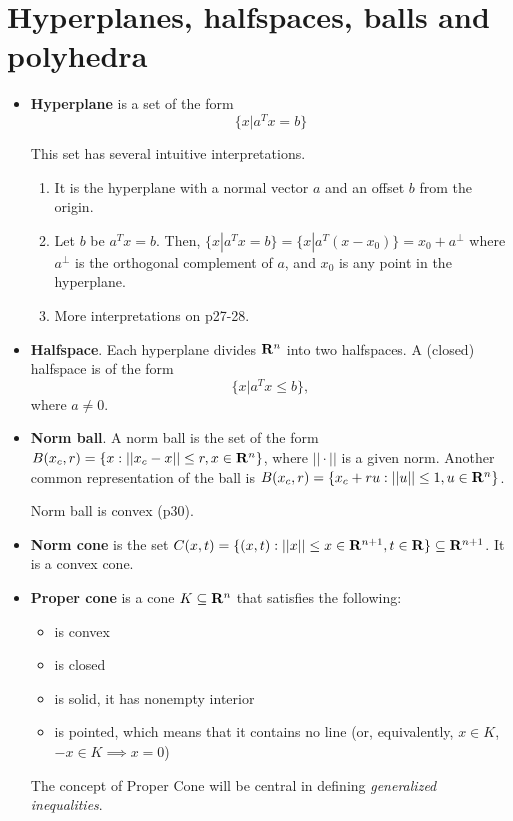 \documentclass[a4paper, oneside]{book}
\begin{document}
\section{Hyperplanes, halfspaces, balls and polyhedra}
\begin{itemize}
\item \textbf{Hyperplane} is a set of the form $$\{x | a^T x = b\}$$

This set has several intuitive interpretations. 
	\begin{enumerate}
	\item It is the hyperplane with a normal vector $a$ and an offset $b$ from the origin.
	\item Let $b$ be $a^T x = b$. Then, $\{x | a^T x = b\} = \{x | a^T (x-x_0)\} = x_0 + a^\perp$ where $a^\perp$ is the orthogonal complement of $a$, and $x_0$ is any point in the hyperplane.
	\item More interpretations on p27-28.
	\end{enumerate}
\item \textbf{Halfspace}. Each hyperplane divides $\mathbf R^n$ into two halfspaces. A (closed) halfspace is of the form $$\{x | a^T x\le b\},$$
where $a \neq 0$.
\item \textbf{Norm ball}. A norm ball is the set of the form $B(x_c, r)=\{ x :  ||x_c-x||\le r, x\in \mathbf R^n \}$, where $||\cdot||$ is a given norm. Another common representation of the ball is $B(x_c, r) = \{x_c+ru : ||u|| \le 1, u \in \mathbf R^n \}$.

Norm ball is convex (p30).
\item \textbf{Norm cone} is the set $C(x,t)=\{(x,t) : ||x||\le  x\in \mathbf R^{n+1}, t \in \mathbf R\} \subseteq \mathbf R^{n+1}$. It is a convex cone.

\item \textbf{Proper cone} is a cone $K \subseteq \mathbf R^n$ that satisfies the following:
	\begin{itemize}
	\item is convex
	\item is closed
	\item is solid, \ie it has nonempty interior
	\item is pointed, which means that it contains no line (or, equivalently, $x\in K$, $-x\in K \implies x =0 $)
	\end{itemize}
	
The concept of Proper Cone will be central in defining \textit{generalized inequalities}.


\end{itemize}
\end{document}
